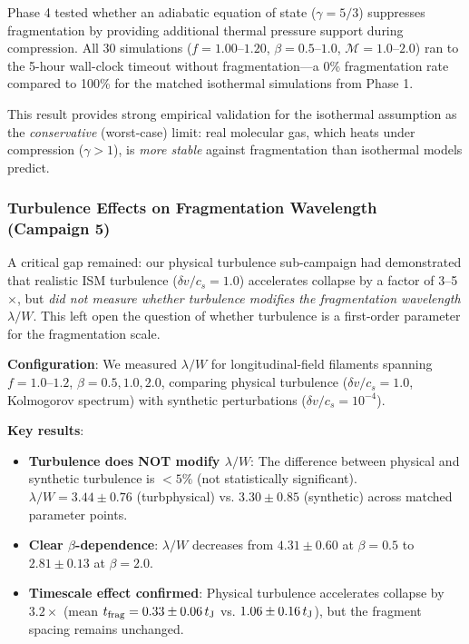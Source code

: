 \documentclass[twocolumn]{mnras}
\begin{document}
Phase 4 tested whether an adiabatic equation of state ($\gamma = 5/3$) suppresses fragmentation by providing additional thermal pressure support during compression. All 30 simulations ($f = 1.00$--$1.20$, $\beta = 0.5$--$1.0$, $\mathcal{M} = 1.0$--$2.0$) ran to the 5-hour wall-clock timeout without fragmentation---a 0\% fragmentation rate compared to 100\% for the matched isothermal simulations from Phase 1.

This result provides strong empirical validation for the isothermal assumption as the {\it conservative} (worst-case) limit: real molecular gas, which heats under compression ($\gamma > 1$), is {\it more stable} against fragmentation than isothermal models predict.

\subsubsection{Turbulence Effects on Fragmentation Wavelength (Campaign 5)}

A critical gap remained: our physical turbulence sub-campaign had demonstrated that realistic ISM turbulence ($\delta v/c_s = 1.0$) accelerates collapse by a factor of 3--5$\times$, but \textit{did not measure whether turbulence modifies the fragmentation wavelength $\lambda/W$}. This left open the question of whether turbulence is a first-order parameter for the fragmentation scale.

\textbf{Configuration}: We measured $\lambda/W$ for longitudinal-field filaments spanning $f = 1.0$--$1.2$, $\beta = 0.5, 1.0, 2.0$, comparing physical turbulence ($\delta v/c_s = 1.0$, Kolmogorov spectrum) with synthetic perturbations ($\delta v/c_s = 10^{-4}$).

\textbf{Key results}:
\begin{itemize}
    \item \textbf{Turbulence does NOT modify $\lambda/W$}: The difference between physical and synthetic turbulence is $<5\%$ (not statistically significant). $\lambda/W = 3.44 \pm 0.76$ (turbphysical) vs. $3.30 \pm 0.85$ (synthetic) across matched parameter points.
    \item \textbf{Clear $\beta$-dependence}: $\lambda/W$ decreases from $4.31 \pm 0.60$ at $\beta = 0.5$ to $2.81 \pm 0.13$ at $\beta = 2.0$.
    \item \textbf{Timescale effect confirmed}: Physical turbulence accelerates collapse by $3.2\times$ (mean $t_{\rm frag} = 0.33 \pm 0.06\,t_{\rm J}$ vs. $1.06 \pm 0.16\,t_{\rm J}$), but the fragment spacing remains unchanged.
\end{itemize}
\end{document}
